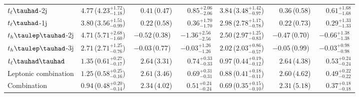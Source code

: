 \documentclass[PAPER, coverpage, atlasdraft=true, texlive=2016, UKenglish]{\ATLASLATEXPATH atlasdoc}
\providecommand{\DIFaddendFL}{} %
\begin{document}
\begin{table}[t!]
\begin{center}
{\begin{tabular}{lcccccc}
\midrule
$t_\ell\tauhad$-2j                 &$4.77$\,($4.23^{+1.72}_{-1.18}$) & \,~~$0.41$\,($0.47$)   & \,~~$0.85^{+2.06}_{-2.06}$  & $3.84$\,($3.48^{+1.42}_{-0.97}$) & \,~~$0.36$\,($0.58$)  & \,~~$0.61^{+1.68}_{-1.68}$\\
$t_\ell\tauhad$-1j                 &$3.80$\,($3.56^{+1.51}_{-0.99}$) & \,~~$0.22$\,($0.58$)   & \,~~$0.36^{+1.70}_{-1.70}$  & $2.98$\,($2.78^{+1.17}_{-0.78}$) & \,~~$0.22$\,($0.73$)  & \,~~$0.29^{+1.33}_{-1.33}$\\
$t_h\tlhad$-2j                  &$4.71$\,($5.71^{+2.68}_{-1.60}$) &$-0.52$\,($0.38$)  &$-1.36^{+2.56}_{-2.56}$ & $2.50$\,($2.97^{+1.25}_{-0.83}$) & $-0.47$\,($0.70$) &$-0.66^{+1.38}_{-1.38}$\\
$t_h\tlhad$-3j                  &$2.71$\,($2.71^{+1.25}_{-0.76}$) &$-0.03$\,($0.77$)  &$-0.03^{+1.26}_{-1.26}$ & $2.02$\,($2.03^{+0.86}_{-0.57}$) & $-0.05$\,($0.99$) &$-0.03^{+0.98}_{-0.98}$\\
$t_\ell\thadhad$                   &$1.35$\,($0.61^{+0.27}_{-0.17}$) & \,~~$2.64$\,($3.31$)   & \,~~$0.74^{+0.33}_{-0.33}$  & $0.97$\,($0.44^{+0.19}_{-0.12}$) & \,~~$2.64$\,($4.38$)  & \,~~$0.53^{+0.24}_{-0.24}$\\ \midrule
Leptonic combination            &$1.25\,$($0.58^{+0.25}_{-0.16}$) & \,~~$2.61$\,($3.46$)   & \,~~$0.69^{+0.31}_{-0.31}$  & $0.88$\,($0.41^{+0.18}_{-0.11}$) & \,~~$2.60$\,($4.62$)  & \,~~$0.49^{+0.22}_{-0.22}$\\
\midrule
Combination                     &$0.94$\,($0.48^{+0.20}_{-0.14}$)& \,~~$2.34$\,($4.02$)   &~~$0.51^{+0.24}_{-0.24}$ & $0.69$\,($0.35^{+0.15}_{-0.10}$)& \,~~$2.31$\,($5.18$)& \,~~$0.37^{+0.18}_{-0.18}$  \\
\bottomrule\bottomrule
\end{tabular}
}
\DIFaddendFL \label{tab:limits_summary}
\end{center}
\end{table}
\end{document}
